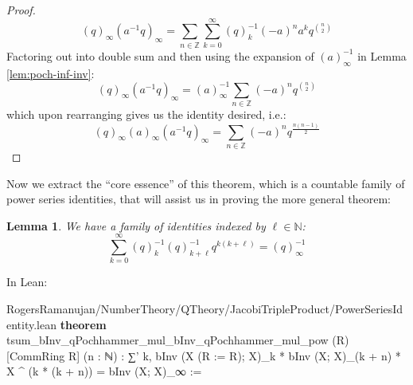 \documentclass[12pt]{amsart}
\newtheorem{lemma}[theorem]{Lemma}
\theoremstyle{definition}
\theoremstyle{remark}
\numberwithin{equation}{subsection}
\newcommand{\N}{\mathbb N}
\newcommand{\Z}{\mathbb Z}
\newcommand{\kw}[1]{\textcolor{keywordcolor}{\textbf{#1}}}
\newcommand{\var}[1]{\textcolor{tacticcolor}{#1}}
\begin{document}
\begin{proof}
\begin{equation}
        (q)_\infty (a^{-1}q)_\infty = \sum_{n \in \Z} \sum_{k=0}^\infty (q)_k^{-1} (-a)^n a^k q^{\binom{n}{2}}
    \end{equation}
    Factoring out into double sum and then using the expansion of $(a)_\infty^{-1}$ in Lemma \ref{lem:poch-inf-inv}:
    \begin{equation}
        (q)_\infty (a^{-1}q)_\infty = (a)_\infty^{-1} \sum_{n \in \Z} (-a)^n q^{\binom{n}{2}}
    \end{equation}
    which upon rearranging gives us the identity desired, i.e.:
    \begin{equation}(q)_\infty (a)_\infty (a^{-1}q)_\infty = \sum_{n \in \Z} (-a)^n q^{\frac{n(n-1)}2}\end{equation}
\end{proof}


Now we extract the ``core essence'' of this theorem, which is a countable family of power series identities, that will assist us in proving the more general theorem:

\begin{lemma}
    \label{lem:jtp-iden}
    We have a family of identities indexed by $\ell \in \N$:
    \begin{equation}
        \sum_{k=0}^\infty (q)_k^{-1} (q)_{k+\ell}^{-1} q^{k(k+\ell)} = (q)_\infty^{-1}
    \end{equation}
\end{lemma}

In Lean:

\begin{code}{RogersRamanujan/NumberTheory/QTheory/JacobiTripleProduct/PowerSeriesIdentity.lean}
\kw{theorem} tsum_bInv_qPochhammer_mul_bInv_qPochhammer_mul_pow (\var{R}) [CommRing \var{R}] (\var{n} : ℕ) :
  ∑' \var{k}, bInv (X (R := \var{R}); X)_\var{k} * bInv (X; X)_(\var{k} + \var{n}) * X ^ (\var{k} * (\var{k} + \var{n})) = bInv (X; X)_∞ :=
\end{code}
    
\end{document}
